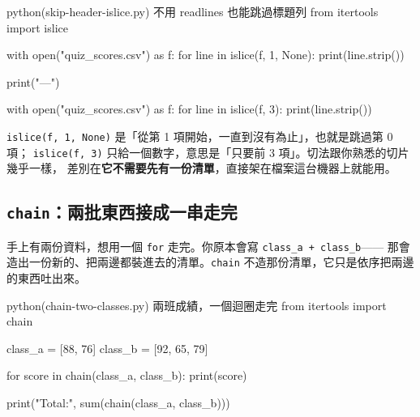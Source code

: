 \begin{example}{python}{(skip-header-islice.py) 不用 readlines 也能跳過標題列}
from itertools import islice

with open("quiz_scores.csv") as f:
    for line in islice(f, 1, None):
        print(line.strip())

print("---")

with open("quiz_scores.csv") as f:
    for line in islice(f, 3):
        print(line.strip())
\end{example}


\texttt{islice(f, 1, None)} 是「從第 1 項開始，一直到沒有為止」，也就是跳過第 0 項；
\texttt{islice(f, 3)} 只給一個數字，意思是「只要前 3 項」。切法跟你熟悉的切片幾乎一樣，
差別在\textbf{它不需要先有一份清單}，直接架在檔案這台機器上就能用。

\subsection*{\texttt{chain}：兩批東西接成一串走完}

手上有兩份資料，想用一個 \texttt{for} 走完。你原本會寫 \texttt{class\_a + class\_b}——
那會造出一份新的、把兩邊都裝進去的清單。\texttt{chain} 不造那份清單，它只是依序把兩邊
的東西吐出來。

\begin{example}{python}{(chain-two-classes.py) 兩班成績，一個迴圈走完}
from itertools import chain

class_a = [88, 76]
class_b = [92, 65, 79]

for score in chain(class_a, class_b):
    print(score)

print("Total:", sum(chain(class_a, class_b)))
\end{example}


